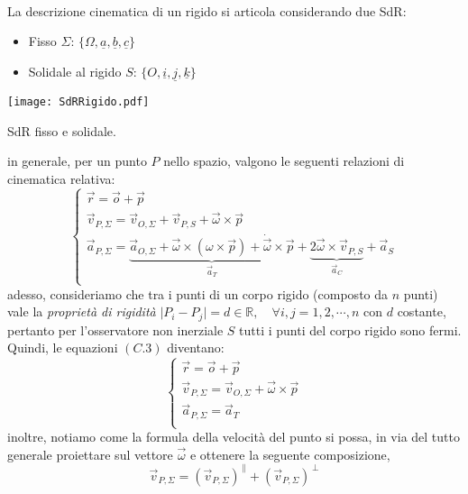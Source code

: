 \paragraph{}
La descrizione cinematica di un rigido si articola considerando due SdR:
\begin{itemize}
	\item Fisso $\Sigma$: $\lbrace\Omega, \underline{a}, \underline{b}, \underline{c}\rbrace$
	\item Solidale al rigido $S$: $\lbrace O, \underline{i}, \underline{j}, \underline{k} \rbrace$
\end{itemize} 
\begin{center}
	\texttt{[image: SdRRigido.pdf]}
	\caption{SdR fisso e solidale.}
\end{center}
in generale, per un punto $P$ nello spazio, valgono le seguenti relazioni di cinematica relativa:
\begin{equation}
	\begin{cases}
		\vec{r} = \vec{o} + \vec{p} \\
		\vec{v}_{P,\Sigma} = \vec{v}_{O,\Sigma} + \vec{v}_{P,S} + \vec{\omega} \times \vec{p} \\
		\vec{a}_{P,\Sigma} = \underbrace{\vec{a}_{O,\Sigma} + \vec{\omega} \times (\omega \times \vec{p}) + \dot{\vec{\omega}} \times \vec{p}}_{\vec{a}_{T}} + \underbrace{2\vec{\omega} \times \vec{v}_{P,S}}_{\vec{a}_{C}} + \vec{a}_{S} \\
	\end{cases}
\end{equation}
adesso, consideriamo che tra i punti di un corpo rigido (composto da $n$ punti) vale la \emph{proprietà di rigidità} $\vert P_i - P_j\vert = d \in \mathbb{R},\quad \forall i,j = 1,2, \cdots, n$ con $d$ costante, pertanto per l'osservatore non inerziale $S$ tutti i punti del corpo rigido sono fermi. Quindi, le equazioni $(C.3)$ diventano:
\begin{equation}
	\begin{cases}
		\vec{r} = \vec{o} + \vec{p} \\
		\vec{v}_{P,\Sigma} = \vec{v}_{O,\Sigma} + \vec{\omega} \times \vec{p} \\
		\vec{a}_{P,\Sigma} = \vec{a}_{T} \\
	\end{cases}
\end{equation}
inoltre, notiamo come la formula della velocità del punto si possa, in via del tutto generale proiettare sul vettore $\vec{\omega}$ e ottenere la seguente composizione,
\begin{equation}
	\vec{v}_{P,\Sigma} = (\vec{v}_{P,\Sigma})^{\,\parallel} + (\vec{v}_{P,\Sigma})^{\,\perp}
\end{equation}
